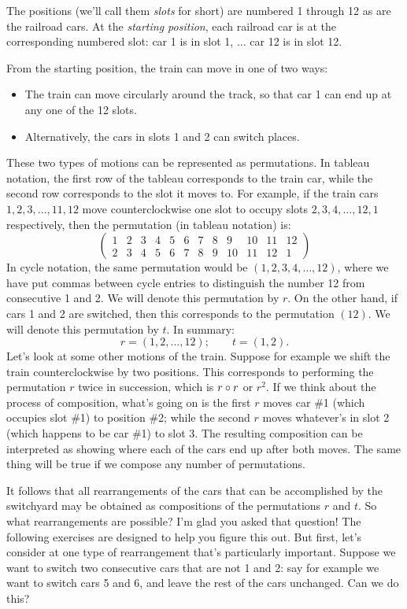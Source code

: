 The positions (we'll call them \emph{slots} for short)  are numbered 1 through 12 as are the railroad cars. At the \emph{starting position}, each railroad car is at the corresponding numbered slot: car 1 is in slot 1, $\ldots$ car 12 is in slot 12.

From the starting position, the train can move in one of two ways:
\begin{itemize}
\item
The train can move circularly around the track, so that car 1 can end up at any one of the 12 slots. 
\item
Alternatively, the cars in slots 1 and 2 can switch places. 
\end{itemize}
These two types of motions can be represented as permutations. In tableau notation, the first row of the tableau corresponds to the train car, while the second row corresponds to the slot it moves to. For example, if the train cars $1,2,3, \ldots ,11, 12$ move counterclockwise one slot to occupy slots $2,3,4,\ldots ,12,1$ respectively, then the permutation (in tableau notation) is:
\[ \left( \begin{array}{cccccccccccc}
1 & 2 & 3 & 4 & 5 & 6 & 7 & 8 & 9 & 10 & 11 & 12 \\
2 & 3 & 4 & 5 & 6 & 7 & 8 & 9 & 10 & 11 & 12 & 1
 \end{array} \right)\] 
In cycle notation,  the same permutation would be $(1, 2, 3, 4, \ldots, 12)$, where we have put commas between cycle entries to distinguish the number 12 from consecutive 1 and 2.  We will denote this permutation by $r$. On the other hand, if cars 1 and 2 are switched, then this corresponds to the permutation $(1 2)$. We will denote this permutation by $t$.  In summary:
\[ r = (1,2,\ldots,12);\qquad  t = (1, 2).\]
Let's look at some other motions of the train. Suppose for example we shift the train counterclockwise by two positions. This corresponds to performing the permutation $r$ twice in succession, which is $r \circ r$ or $r^2$.   If we think about the process of composition, what's going on is the first $r$ moves car \#1 (which occupies slot \#1) to position \#2; while the second $r$ moves whatever's in slot 2 (which happens to be car \#1) to slot 3. The resulting composition can be interpreted as showing where each of the cars end up after both moves.  The same thing will be true  if we compose any number of permutations. 

It follows that all rearrangements of the cars that can be accomplished by the switchyard may be obtained as compositions of the permutations $r$ and $t$. So what rearrangements are possible? I'm glad you asked that question! The following exercises are designed to help you figure this out. But first, let's consider at one type of rearrangement that's particularly important. Suppose we want to switch two consecutive cars that are not 1 and 2: say for example we want to switch cars 5 and 6, and leave the rest of the cars unchanged.  Can we do this? 

